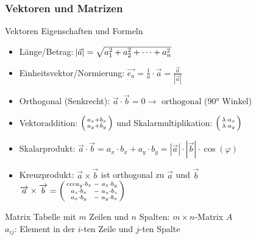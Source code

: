 

\subsubsection{Vektoren und Matrizen}
\small

\begin{concept}{Vektoren Eigenschaften und Formeln}
    \begin{itemize}
        \item Länge/Betrag: $\abs{\vec{a}}=\sqrt{a_1^2+a_2^2+\cdots+a_n^2}$
        \item Einheitsvektor/Normierung: $\vec{e_a}=\frac{1}{a}\cdot\vec{a} = \frac{\overrightarrow{a}}{|\overrightarrow{a}|}$
        \item Orthogonal (Senkrecht): $\overrightarrow{a} \cdot \overrightarrow{b} = 0 \rightarrow \text{ orthogonal}$ (90° Winkel)
        \item Vektoraddition: $\begin{psmallmatrix} a_x + b_x\\ a_y + b_y \end{psmallmatrix}$ und Skalarmultiplikation: $\begin{psmallmatrix} \lambda \cdot a_x \\ \lambda \cdot a_y \end{psmallmatrix}$
        \item Skalarprodukt: $\overrightarrow{a} \cdot \overrightarrow{b} = a_x \cdot b_x + a_y \cdot b_y = |\overrightarrow{a}| \cdot |\overrightarrow{b}| \cdot \cos(\varphi)$
        \item Kreuzprodukt: $\overrightarrow{a} \times \overrightarrow{b}$ ist orthogonal zu $\overrightarrow{a}$ und $\overrightarrow{b}$\\
        $\overrightarrow{a} \times \overrightarrow{b} = \begin{psmallmatrix}{ccc}
            a_y \cdot b_z &-& a_z \cdot b_y \\
            a_z \cdot b_x &-& a_x \cdot b_z \\
            a_x \cdot b_y &-& a_y \cdot b_x
            \end{psmallmatrix}$
    \end{itemize}
\end{concept}


\raggedcolumns

    \begin{definition}{Matrix}
        Tabelle mit $m$ Zeilen und $n$ Spalten: $m \times n$-Matrix $A$\\
        $a_{ij}$: Element in der $i$-ten Zeile und $j$-ten Spalte
    \end{definition}
    

